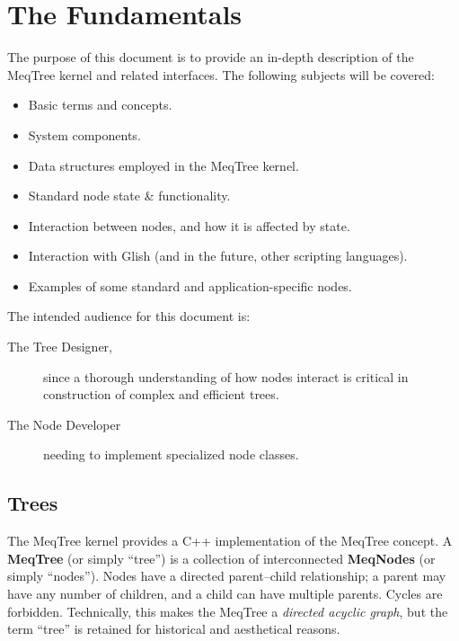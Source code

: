 \chapter{The Fundamentals}

  The purpose of this document is to provide an in-depth description of the
  MeqTree kernel and related interfaces. The following subjects will be
  covered:

  \begin{itemize}

  \item Basic terms and concepts.

  \item System components.

  \item Data structures employed in the MeqTree kernel.

  \item Standard node state \& functionality.

  \item Interaction between nodes, and how it is affected by state.

  \item Interaction with Glish (and in the future, other scripting languages).

  \item Examples of some standard and application-specific nodes.

  \end{itemize}

  The intended audience for this document is:

  \begin{description}

  \item[The Tree Designer,] since a thorough understanding of how nodes interact
  is critical in construction of complex and efficient trees.

  \item[The Node Developer] needing to implement specialized node classes.

  \end{description}


\section{Trees}

  The MeqTree kernel provides a C++ implementation of the MeqTree concept. A {\bf
  MeqTree} (or simply ``tree'') is a collection of interconnected {\bf MeqNodes}
  (or simply ``nodes''). Nodes have a directed parent--child relationship; a
  parent may have any number of children, and a child can have multiple parents.
  Cycles are forbidden. Technically, this makes the MeqTree a {\em directed
  acyclic graph}, but the term ``tree'' is retained for historical and
  aesthetical reasons.


